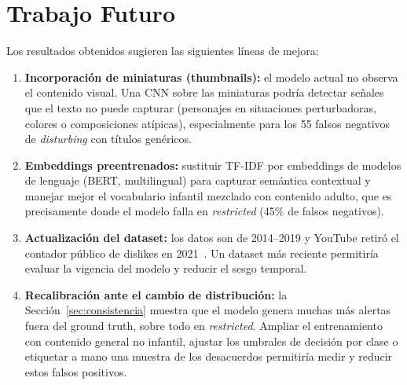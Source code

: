 \documentclass[conference]{IEEEtran}
\begin{document}
\section{Trabajo Futuro}\label{sec:next}
Los resultados obtenidos sugieren las siguientes líneas de mejora:
\begin{enumerate}
\item \textbf{Incorporación de miniaturas (thumbnails):} el modelo actual no observa el contenido visual. Una CNN sobre las miniaturas podría detectar señales que el texto no puede capturar (personajes en situaciones perturbadoras, colores o composiciones atípicas), especialmente para los 55 falsos negativos de \textit{disturbing} con títulos genéricos.
\item \textbf{Embeddings preentrenados:} sustituir TF-IDF por embeddings de modelos de lenguaje (BERT, multilingual) para capturar semántica contextual y manejar mejor el vocabulario infantil mezclado con contenido adulto, que es precisamente donde el modelo falla en \textit{restricted} (45\% de falsos negativos).
\item \textbf{Actualización del dataset:} los datos son de 2014--2019 y YouTube retiró el contador público de dislikes en 2021~\cite{ytdislikes}. Un dataset más reciente permitiría evaluar la vigencia del modelo y reducir el sesgo temporal.
\item \textbf{Recalibración ante el cambio de distribución:} la Sección~\ref{sec:consistencia} muestra que el modelo genera muchas más alertas fuera del ground truth, sobre todo en \textit{restricted}. Ampliar el entrenamiento con contenido general no infantil, ajustar los umbrales de decisión por clase o etiquetar a mano una muestra de los desacuerdos permitiría medir y reducir estos falsos positivos.
\end{enumerate}


\nocite{urbina2026machinelearning}
{\raggedright

}
\end{document}

